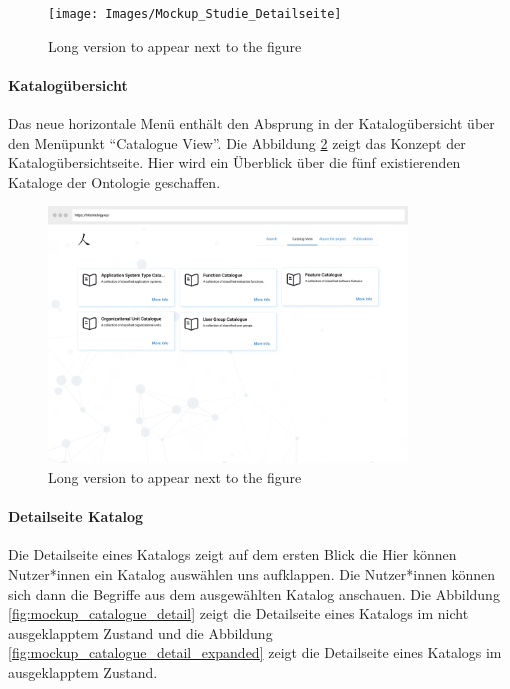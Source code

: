 \begin{figure}
	\centering
    	\texttt{[image: Images/Mockup\_Studie\_Detailseite]}
   	\caption[Mockup -- Detailseite Studie]{Long version to appear next to the figure}
   	\label{fig:mockup_study_detail}
\end{figure}

\clearpage

\paragraph{Katalogübersicht}

Das neue horizontale Menü enthält den Absprung in der Katalogübersicht über den Menüpunkt \enquote{Catalogue View}.
Die Abbildung \ref{fig:mockup_catalogue_overview} zeigt das Konzept der Katalogübersichtseite.
Hier wird ein Überblick über die fünf existierenden Kataloge der Ontologie geschaffen.

\begin{figure}
	\centering
    	\includegraphics[width=0.85\textwidth]{Images/Mockup_Katalog_Uebersicht}
   	\caption[Mockup -- Katalogübersicht]{Long version to appear next to the figure}
   	\label{fig:mockup_catalogue_overview}
\end{figure}

\clearpage

\paragraph{Detailseite Katalog}

Die Detailseite eines Katalogs zeigt auf dem ersten Blick die 
Hier können Nutzer*innen ein Katalog auswählen uns aufklappen.
Die Nutzer*innen können sich dann die Begriffe aus dem ausgewählten Katalog anschauen.
Die Abbildung \ref{fig:mockup_catalogue_detail} zeigt die Detailseite eines Katalogs im nicht ausgeklapptem Zustand und die Abbildung \ref{fig:mockup_catalogue_detail_expanded} zeigt die Detailseite eines Katalogs im ausgeklapptem Zustand.


